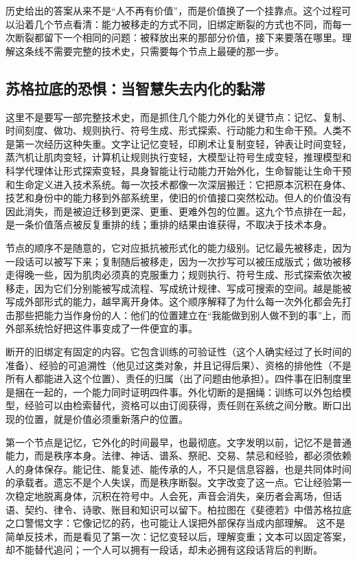 历史给出的答案从来不是“人不再有价值”，而是价值换了一个挂靠点。这个过程可以沿着几个节点看清：能力被移走的方式不同，旧绑定断裂的方式也不同，而每一次断裂都留下一个相同的问题：被释放出来的那部分价值，接下来要落在哪里。理解这条线不需要完整的技术史，只需要每个节点上最硬的那一步。

\subsection{苏格拉底的恐惧：当智慧失去内化的黏滞}


这里不是要写一部完整技术史，而是抓住几个能力外化的关键节点：记忆、复制、时间刻度、做功、规则执行、符号生成、形式探索、行动能力和生命干预。人类不是第一次经历这种失重。文字让记忆变轻，印刷术让复制变轻，钟表让时间变轻，蒸汽机让肌肉变轻，计算机让规则执行变轻，大模型让符号生成变轻，推理模型和科学代理体让形式探索变轻，具身智能让行动能力开始外化，生命智能让生命干预和生命定义进入技术系统。每一次技术都像一次深层搬迁：它把原本沉积在身体、技艺和身份中的能力移到外部系统里，使旧的价值接口突然松动。但人的价值没有因此消失，而是被迫迁移到更深、更重、更难外包的位置。这九个节点排在一起，是一条价值落点被反复重排的线；重排的结果由谁获得，不取决于技术本身。

节点的顺序不是随意的，它对应抵抗被形式化的能力级别。记忆最先被移走，因为一段话可以被写下来；复制随后被移走，因为一次抄写可以被压成版式；做功被移走得晚一些，因为肌肉必须真的克服重力；规则执行、符号生成、形式探索依次被移走，因为它们分别能被写成流程、写成统计规律、写成可搜索的空间。越是能被写成外部形式的能力，越早离开身体。这个顺序解释了为什么每一次外化都会先打击那些把能力当作身份的人：他们的位置建立在“我能做到别人做不到的事”上，而外部系统恰好把这件事变成了一件便宜的事。

断开的旧绑定有固定的内容。它包含训练的可验证性（这个人确实经过了长时间的准备）、经验的可追溯性（他见过这类对象，并且记得后果）、资格的排他性（不是所有人都能进入这个位置）、责任的归属（出了问题由他承担）。四件事在旧制度里是捆在一起的，一个能力同时证明四件事。外化切断的是捆绳：训练可以外包给模型，经验可以由检索替代，资格可以由订阅获得，责任则在系统之间分散。断口出现的位置，就是价值必须重新落户的位置。


第一个节点是记忆，它外化的时间最早，也最彻底。文字发明以前，记忆不是普通能力，而是秩序本身。法律、神话、谱系、祭祀、交易、禁忌和经验，都必须依赖人的身体保存。能记住、能复述、能传承的人，不只是信息容器，也是共同体时间的承载者。遗忘不是个人失误，而是秩序断裂。文字改变了这一点。它让经验第一次稳定地脱离身体，沉积在符号中。人会死，声音会消失，亲历者会离场，但话语、契约、律令、诗歌、账目和知识可以留下。柏拉图在《斐德若》中借苏格拉底之口警惕文字：它像记忆的药，也可能让人误把外部保存当成内部理解。\cite{plato_phaedrus} 这不是简单反技术，而是看见了第一次：记忆变轻以后，理解变重；文本可以固定答案，却不能替代追问；一个人可以拥有一段话，却未必拥有这段话背后的判断。

